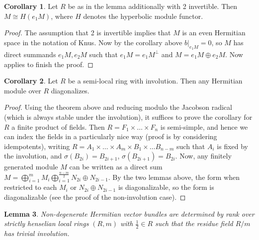\documentclass[edeposit,fullpage]{uiucthesis2009}
\theoremstyle{plain}
\newtheorem{lemma}{Lemma}
\numberwithin{lemma}{section}
\theoremstyle{definition}
\newtheorem{corollary}[lemma]{Corollary}
\begin{document}
\begin{corollary} \label{HermFormsOverSwitch} 
Let $R$ be as in the lemma additionally with 2 invertible. Then $M \cong H(e_1M)$, where $H$ denotes
the hyperbolic module functor. 
\end{corollary}

\begin{proof}
The assumption that 2 is invertible implies that $M$ is an even
Hermitian space in the notation of Knus. Now by the corollary above
$b|_{e_1M} = 0$, so $M$ has direct summands $e_1M, e_2M$ such that $e_1M =
e_1M^{\perp}$ and $M = e_1 M \oplus e_2M$. Now \cite[Corollary 3.7.3]{HermKnus} applies to finish the proof.
\end{proof}

\begin{corollary}\label{cor:herm_diag}
Let $R$ be a semi-local ring with involution. Then any Hermitian
module over $R$ diagonalizes.
\end{corollary}

\begin{proof}
Using the theorem above and reducing modulo the Jacobson radical
(which is always stable under the involution), it
suffices to prove the corollary for $R$ a finite product of
fields. Then $R = F_1 \times \dots \times F_n$ is semi-simple, and
hence we can index the fields in a particularly nice way (proof is by
considering idempotents), writing $R = A_1 \times \dots \times A_m \times B_1 \times
\dots B_{n-m}$ such that $A_i$ is fixed by the involution, and
$\sigma(B_{2i}) = B_{2i+1}$, $\sigma(B_{2i+1}) = B_{2i}$. Now, any
finitely generated module $M$ can be written as a direct sum $M =
\bigoplus_{i=1}^m M_i \bigoplus_{i=1}^{\frac{n-m}{2}} N_{2i} \oplus
N_{2i-1}$. By the two lemmas above, the form when restricted to each
$M_i$ or $N_{2i} \oplus N_{2i-1}$ is diagonalizable, so the form is
diagonalizable (see the proof of the non-involution case).   
\end{proof}


\begin{lemma}\label{lem:semiloc_herm_form_rank}
Non-degenerate Hermitian vector bundles are determined by rank over strictly
henselian local rings $(R,m)$ with $\frac{1}{2} \in R$ such that the residue field $R/m$ has
trivial involution.
\end{lemma}
\end{document}
